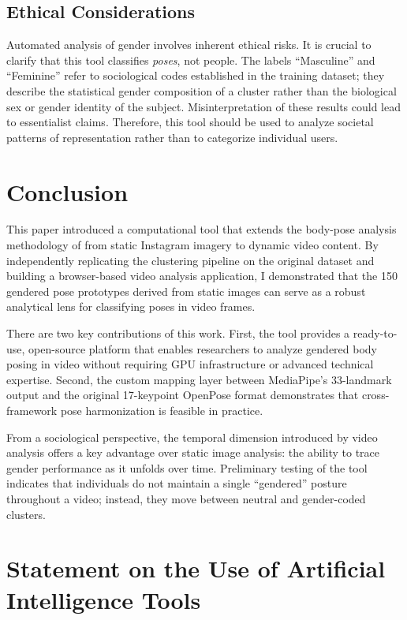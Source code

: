 \documentclass[12pt, a4paper]{article}
\begin{document}
\subsection{Ethical Considerations}
\label{sec:ethics}

Automated analysis of gender involves inherent ethical risks. It is crucial to clarify that this tool classifies \emph{poses}, not people. The labels ``Masculine'' and ``Feminine'' refer to sociological codes established in the training dataset; they describe the statistical gender composition of a cluster rather than the biological sex or gender identity of the subject. Misinterpretation of these results could lead to essentialist claims. Therefore, this tool should be used to analyze societal patterns of representation rather than to categorize individual users.


\section{Conclusion}
\label{sec:conclusion}

This paper introduced a computational tool that extends the body-pose analysis methodology of \citet{tsolak2025unveiling} from static Instagram imagery to dynamic video content. By independently replicating the clustering pipeline on the original dataset and building a browser-based video analysis application, I demonstrated that the 150 gendered pose prototypes derived from static images can serve as a robust analytical lens for classifying poses in video frames.

There are two key contributions of this work. First, the tool provides a ready-to-use, open-source platform that enables researchers to analyze gendered body posing in video without requiring GPU infrastructure or advanced technical expertise. Second, the custom mapping layer between MediaPipe's 33-landmark output and the original 17-keypoint OpenPose format demonstrates that cross-framework pose harmonization is feasible in practice.

From a sociological perspective, the temporal dimension introduced by video analysis offers a key advantage over static image analysis: the ability to trace gender performance as it unfolds over time. Preliminary testing of the tool indicates that individuals do not maintain a single ``gendered'' posture throughout a video; instead, they move between neutral and gender-coded clusters.




\section*{Statement on the Use of Artificial Intelligence Tools}
\end{document}
